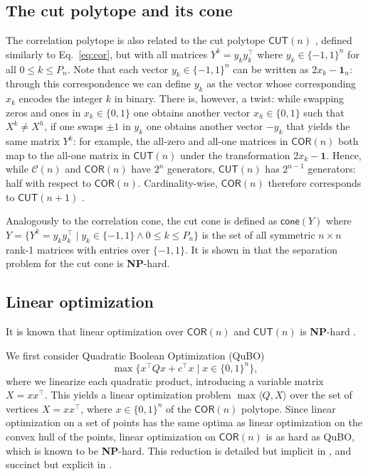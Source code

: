 \documentclass[envcountsect,envcountsame]{svjour3}
\theoremstyle{changebreak}                %
\newcommand{\transpose}[1]{{#1}^{\top}}
\newcommand{\cone}[1]{\mathsf{cone}(#1)}
\newcommand{\COR}[1]{\mathsf{COR}(#1)}
\newcommand{\CUT}[1]{\mathsf{CUT}(#1)}
\newcommand{\CONX}[1]{\mathcal{C}(#1)}
\begin{document}
\subsection{The cut polytope and its cone}
\label{s:cutpolycone}
The correlation polytope is also related to the cut polytope $\CUT{n}$ \cite{dezaLaurent}, defined similarly to Eq.~\eqref{eq:cor}, but with all matrices $Y^k=y_k\transpose{y}_k$ where $y_k\in\{-1,1\}^n$ for all  $0\le k\le P_n$. Note that each vector $y_k\in\{-1,1\}^n$ can be written as $2x_k-\mathbf{1}_n$: through this correspondence we can define $y_k$ as the vector whose corresponding $x_k$ encodes the integer $k$ in binary. There is, however, a twist: while swapping zeros and ones in $x_k\in\{0,1\}$ one obtains another vector $x_h\in\{0,1\}$ such that $X^k\not=X^h$, if one swaps $\pm 1$ in $y_k$ one obtains another vector $-y_k$ that yields the same matrix $Y^k$: for example, the all-zero and all-one matrices in $\COR{n}$ both map to the all-one matrix in $\CUT{n}$ under the transformation $2x_k-\mathbf{1}$. Hence, while $\CONX{n}$ and $\COR{n}$ have $2^n$ generators, $\CUT{n}$ has $2^{n-1}$ generators: half with respect to $\COR{n}$. Cardinality-wise, $\COR{n}$ therefore corresponds to $\CUT{n+1}$ \cite{desimone90}.

Analogously to the correlation cone, the cut cone is defined as $\cone{Y}$ where $Y=\{Y^k=y_k\transpose{y}_k\;|\;y_k\in\{-1,1\}\land 0\le k\le P_n\}$ is the set of all symmetric $n\times n$ rank-1 matrices with entries over $\{-1,1\}$. It is shown in \cite{karzanov} that the separation problem for the cut cone is \textbf{NP}-hard. 

\subsection{Linear optimization}
\label{s:linopt}
It is known that linear optimization over $\COR{n}$ and $\CUT{n}$ is \textbf{NP}-hard \cite{bqp,dezaLaurent}.

We first consider Quadratic Boolean Optimization (QuBO)
\[\max\{\transpose{x}Qx+\transpose{c}x\;|\;x\in\{0,1\}^n\},\]
where we linearize each quadratic product, introducing a variable matrix $X=x\transpose{x}$. This yields a linear optimization problem $\max \langle Q,X\rangle$ over the set of vertices $X=x\transpose{x}$, where $x\in\{0,1\}^n$ of the $\COR{n}$ polytope. Since linear optimization on a set of points has the same optima as linear optimization on the convex hull of the points, linear optimization on $\COR{n}$ is as hard as QuBO, which is known to be \textbf{NP}-hard. This reduction is detailed but implicit in \cite[Eq.~(1)-(8)]{bqp}, and succinct but explicit in \cite[Eq.~(5.1.4), p.~54]{dezaLaurent}.
\end{document}
